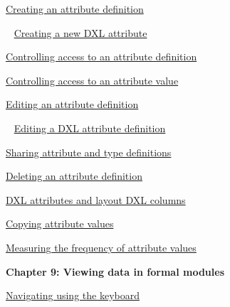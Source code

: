 \documentclass[11pt,a4paper]{article}
\begin{document}
\href{https://www.ibm.com/support/knowledgecenter/search/Creating%20an%20attribute%20definition?scope=SSYQBZ_9.6.1}{Creating an attribute definition}

\,\,\, \href{https://www.ibm.com/support/knowledgecenter/search/Creating%20a%20new%20DXL%20attribute?scope=SSYQBZ_9.6.1}{Creating a new DXL attribute}

\href{https://www.ibm.com/support/knowledgecenter/search/Controlling%20access%20to%20an%20attribute%20definition?scope=SSYQBZ_9.6.1}{Controlling access to an attribute definition}

\href{https://www.ibm.com/support/knowledgecenter/search/Controlling%20access%20to%20an%20attribute%20value?scope=SSYQBZ_9.6.1}{Controlling access to an attribute value}

\href{https://www.ibm.com/support/knowledgecenter/search/Editing%20an%20attribute%20definition?scope=SSYQBZ_9.6.1}{Editing an attribute definition}

\,\,\, \href{https://www.ibm.com/support/knowledgecenter/search/Editing%20a%20DXL%20attribute%20definition?scope=SSYQBZ_9.6.1}{Editing a DXL attribute definition}

\href{https://www.ibm.com/support/knowledgecenter/search/Sharing%20attribute%20and%20type%20definitions?scope=SSYQBZ_9.6.1}{Sharing attribute and type definitions}

\href{https://www.ibm.com/support/knowledgecenter/search/Deleting%20an%20attribute%20definition?scope=SSYQBZ_9.6.1}{Deleting an attribute definition}

\href{https://www.ibm.com/support/knowledgecenter/search/DXL%20attributes%20and%20layout%20DXL%20columns?scope=SSYQBZ_9.6.1}{DXL attributes and layout DXL columns}

\href{https://www.ibm.com/support/knowledgecenter/search/Copying%20attribute%20values?scope=SSYQBZ_9.6.1}{Copying attribute values}

\href{https://www.ibm.com/support/knowledgecenter/search/Measuring%20the%20frequency%20of%20attribute%20values?scope=SSYQBZ_9.6.1}{Measuring the frequency of attribute values} \\

\newpage

\begin{Large}\textbf{Chapter 9: Viewing data in formal modules} \end{Large} 
\vspace{1mm}

\href{https://www.ibm.com/support/knowledgecenter/search/Navigating%20using%20the%20keyboard?scope=SSYQBZ_9.6.1}{Navigating using the keyboard}
\end{document}
